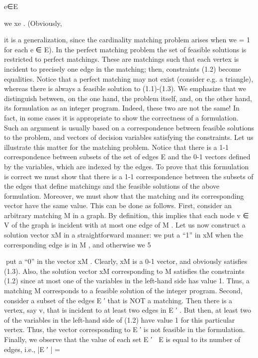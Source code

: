 \documentclass[titlepage]{book}
\begin{document}
e∈E

we xe . (Obviously,

it is a generalization, since the cardinality matching problem arises when we = 1 for each e ∈ E). In
the perfect matching problem the set of feasible solutions is restricted to perfect matchings. These are
matchings such that each vertex is incident to precisely one edge in the matching; then, constraints (1.2)
become equalities. Notice that a perfect matching may not exist (consider e.g. a triangle), whereas there
is always a feasible solution to (1.1)-(1.3).
We emphasize that we distinguish between, on the one hand, the problem itself, and, on the other hand,
its formulation as an integer program. Indeed, these two are not the same! In fact, in some cases
it is appropriate to show the correctness of a formulation. Such an argument is usually based on a
correspondence between feasible solutions to the problem, and vectors of decision variables satisfying the
constraints.
Let us illustrate this matter for the matching problem. Notice that there is a 1-1 correspondence between
subsets of the set of edges E and the 0-1 vectors defined by the variables, which are indexed by the edges.
To prove that this formulation is correct we must show that there is a 1-1 correspondence between the
subsets of the edges that define matchings and the feasible solutions of the above formulation. Moreover,
we must show that the matching and its corresponding vector have the same value. This can be done as
follows. First, consider an arbitrary matching M in a graph. By definition, this implies that each node
v ∈ V of the graph is incident with at most one edge of M . Let us now construct a solution vector xM in
a straightforward manner: we put a “1” in xM when the corresponding edge is in M , and otherwise we
5

put a “0” in the vector xM . Clearly, xM is a 0-1 vector, and obviously satisfies (1.3). Also, the solution
vector xM corresponding to M satisfies the constraints (1.2) since at most one of the variables in the
left-hand side has value 1. Thus, a matching M corresponds to a feasible solution of the integer program.
Second, consider a subset of the edges E ′ that is NOT a matching. Then there is a vertex, say v, that
is incident to at least two edges in E ′ . But then, at least two of the variables in the left-hand side of
(1.2) have value 1 for this particular vertex. Thus, the vector corresponding to E ′ is not feasible in the
formulation. Finally, we observe that the value of each set E ′ ⊆ E is equal to its number of edges, i.e.,
|E ′ | =
\end{document}
